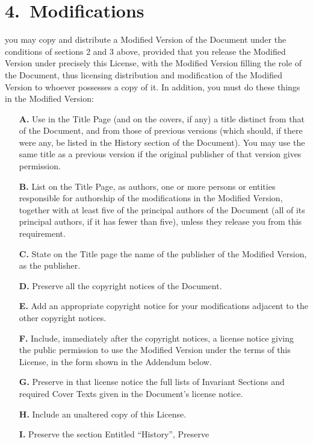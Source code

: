 \section*{4.\ Modifications}

you may copy and distribute a Modified Version of the Document under
the conditions of sections 2 and 3 above, provided that you release
the Modified Version under precisely this License, with the Modified
Version filling the role of the Document, thus licensing distribution
and modification of the Modified Version to whoever possesses a copy
of it. In addition, you must do these things in the Modified Version:

\begin{itemize}
\item[\textbf{A.}] Use in the Title Page (and on the covers, if any) a
  title distinct from that of the Document, and from those of previous
  versions (which should, if there were any, be listed in the History
  section of the Document). You may use the same title as a previous
  version if the original publisher of that version gives permission.
\item[\textbf{B.}] List on the Title Page, as authors, one or more
  persons or entities responsible for authorship of the modifications
  in the Modified Version, together with at least five of the
  principal authors of the Document (all of its principal authors, if
  it has fewer than five), unless they release you from this
  requirement.
\item[\textbf{C.}] State on the Title page the name of the publisher
  of the Modified Version, as the publisher.
\item[\textbf{D.}] Preserve all the copyright notices of the
  Document.
\item[\textbf{E.}] Add an appropriate copyright notice for your
  modifications adjacent to the other copyright notices.
\item[\textbf{F.}] Include, immediately after the copyright notices, a
  license notice giving the public permission to use the Modified
  Version under the terms of this License, in the form shown in the
  Addendum below.
\item[\textbf{G.}] Preserve in that license notice the full lists of
  Invariant Sections and required Cover Texts given in the Document's
  license notice.
\item[\textbf{H.}] Include an unaltered copy of this License.
\item[\textbf{I.}] Preserve the section Entitled ``History'', Preserve

\end{itemize}
